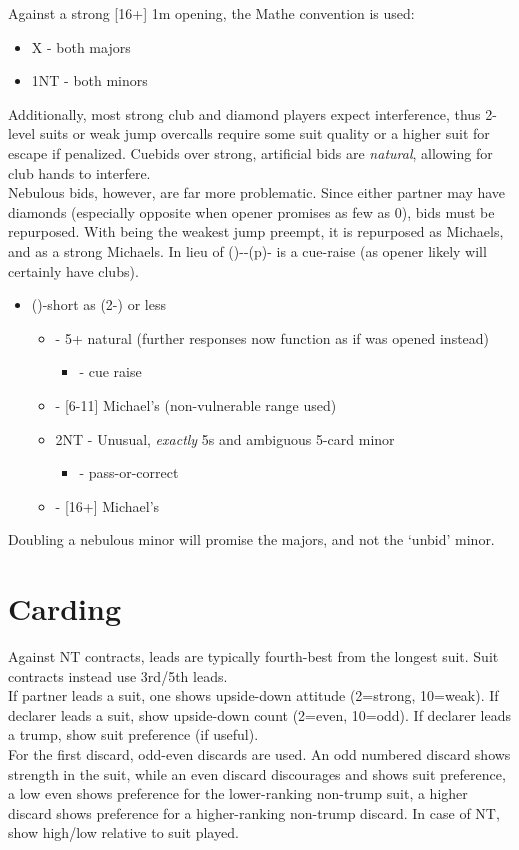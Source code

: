 \documentclass[12pt]{report}
\newcommand{\n}{\\}
\newcommand{\ul}[1]{\begin{itemize}#1\end{itemize}}
\newcommand{\li}{\item[~]}
\begin{document}
    Against a strong [16+] 1m opening, the Mathe convention is used:

    \ul {
        \li X - both majors
        \li 1NT - both minors
    }

    Additionally, most strong club and diamond players expect interference, thus 2-level suits or weak jump overcalls require some suit quality or a higher suit for escape if penalized.  Cuebids over strong, artificial bids are \textit{natural}, allowing for club hands to interfere.\n

    Nebulous bids, however, are far more problematic.  Since either partner may have diamonds (especially opposite when opener promises as few as 0), bids must be repurposed.  With  being the weakest jump preempt, it is repurposed as Michaels, and  as a strong Michaels.  In lieu of ()--(p)- is a cue-raise (as opener likely will certainly have clubs).
    
    \ul {
        \li ()-short as (2-) or less
        \ul {
            \li \di2 - 5+ natural (further responses now function as if \cl1 was opened instead)
            \ul {
                \li \cl3 - cue raise
            }
            \li \he2 - [6-11] Michael's (non-vulnerable range used)
            \li 2NT - Unusual, \textit{exactly} 5\he{}s and ambiguous 5-card minor
            \ul {
                \li \cl3 - pass-or-correct
            }
            \li \di3 - [16+] Michael's
        }
    }

    Doubling a nebulous minor will promise the majors, and not the `unbid' minor.

\chapter{Carding}

    Against NT contracts, leads are typically fourth-best from the longest suit.  Suit contracts instead use 3rd/5th leads. \n

    If partner leads a suit, one shows upside-down attitude (2=strong, 10=weak).  If declarer leads a suit, show upside-down count (2=even, 10=odd).  If declarer leads a trump, show suit preference (if useful). \n

    For the first discard, odd-even discards are used.  An odd numbered discard shows strength in the suit, while an even discard discourages and shows suit preference, a low even shows preference for the lower-ranking non-trump suit, a higher discard shows preference for a higher-ranking non-trump discard.  In case of NT, show high/low relative to suit played.\n
\end{document}
